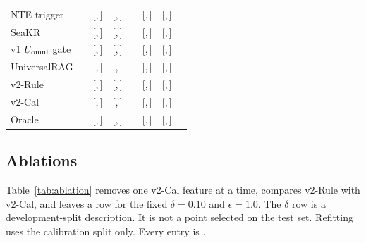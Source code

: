 \begin{table}[t]
\begin{tabular}{@{}lccccccc@{}}
NTE trigger & \ph{} & \ph{} [\ph{},\,\ph{}] & \ph{} [\ph{},\,\ph{}] & \ph{} & \ph{} [\ph{},\,\ph{}] & \ph{} [\ph{},\,\ph{}] & \ph{} \\
SeaKR & \ph{} & \ph{} [\ph{},\,\ph{}] & \ph{} [\ph{},\,\ph{}] & \ph{} & \ph{} [\ph{},\,\ph{}] & \ph{} [\ph{},\,\ph{}] & \ph{} \\
v1 $U_{\mathrm{omni}}$ gate & \ph{} & \ph{} [\ph{},\,\ph{}] & \ph{} [\ph{},\,\ph{}] & \ph{} & \ph{} [\ph{},\,\ph{}] & \ph{} [\ph{},\,\ph{}] & \ph{} \\
UniversalRAG & \ph{} & \ph{} [\ph{},\,\ph{}] & \ph{} [\ph{},\,\ph{}] & \ph{} & \ph{} [\ph{},\,\ph{}] & \ph{} [\ph{},\,\ph{}] & \ph{} \\
v2-Rule & \ph{} & \ph{} [\ph{},\,\ph{}] & \ph{} [\ph{},\,\ph{}] & \ph{} & \ph{} [\ph{},\,\ph{}] & \ph{} [\ph{},\,\ph{}] & \ph{} \\
v2-Cal & \ph{} & \ph{} [\ph{},\,\ph{}] & \ph{} [\ph{},\,\ph{}] & \ph{} & \ph{} [\ph{},\,\ph{}] & \ph{} [\ph{},\,\ph{}] & \ph{} \\
Oracle & \ph{} & \ph{} [\ph{},\,\ph{}] & \ph{} [\ph{},\,\ph{}] & \ph{} & \ph{} [\ph{},\,\ph{}] & \ph{} [\ph{},\,\ph{}] & \ph{} \\
\bottomrule
\end{tabular}
\end{table}

\subsection{Ablations}
\label{sec:ablation}
Table~\ref{tab:ablation} removes one v2-Cal feature at a time, compares v2-Rule with v2-Cal, and leaves a row for the fixed $\delta=0.10$ and $\epsilon=1.0$.
The $\delta$ row is a development-split description.
It is not a point selected on the test set.
Refitting uses the calibration split only.
Every entry is \ph{}.

